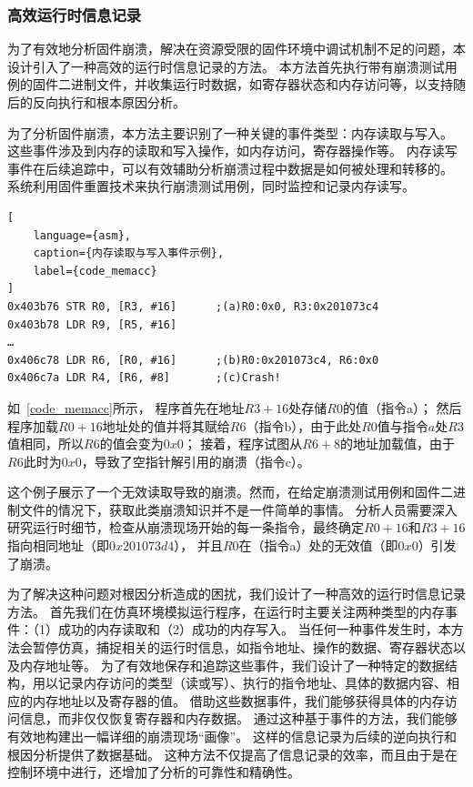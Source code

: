 \subsubsection{高效运行时信息记录}
为了有效地分析固件崩溃，解决在资源受限的固件环境中调试机制不足的问题，本设计引入了一种高效的运行时信息记录的方法。
本方法首先执行带有崩溃测试用例的固件二进制文件，并收集运行时数据，如寄存器状态和内存访问等，以支持随后的反向执行和根本原因分析。

为了分析固件崩溃，本方法主要识别了一种关键的事件类型：内存读取与写入。
这些事件涉及到内存的读取和写入操作，如内存访问，寄存器操作等。
内存读写事件在后续追踪中，可以有效辅助分析崩溃过程中数据是如何被处理和转移的。
系统利用固件重置技术来执行崩溃测试用例，同时监控和记录内存读写。
\begin{lstlisting}[
    language={asm},
    caption={内存读取与写入事件示例},
    label={code_memacc}
]
0x403b76 STR R0, [R3, #16]      ;(a)R0:0x0, R3:0x201073c4
0x403b78 LDR R9, [R5, #16]
…
0x406c78 LDR R6, [R0, #16]      ;(b)R0:0x201073c4, R6:0x0
0x406c7a LDR R4, [R6, #8]       ;(c)Crash!
\end{lstlisting}

如~\autoref{code_memacc}所示， 程序首先在地址$R3 + 16$处存储$R0$的值（指令a）；
然后程序加载$R0 + 16$地址处的值并将其赋给$R6$（指令b），由于此处$R0$值与指令$a$处$R3$值相同，所以$R6$的值会变为$0x0$；
接着，程序试图从$R6 + 8$的地址加载值，由于$R6$此时为$0x0$，导致了空指针解引用的崩溃（指令c）。

这个例子展示了一个无效读取导致的崩溃。然而，在给定崩溃测试用例和固件二进制文件的情况下，获取此类崩溃知识并不是一件简单的事情。
分析人员需要深入研究运行时细节，检查从崩溃现场开始的每一条指令，最终确定$R0 + 16$和$R3 + 16$指向相同地址（即$0x201073d4$），
并且$R0$在（指令a）处的无效值（即$0x0$）引发了崩溃。

为了解决这种问题对根因分析造成的困扰，我们设计了一种高效的运行时信息记录方法。
首先我们在仿真环境模拟运行程序，在运行时主要关注两种类型的内存事件：（1）成功的内存读取和（2）成功的内存写入。
当任何一种事件发生时，本方法会暂停仿真，捕捉相关的运行时信息，如指令地址、操作的数据、寄存器状态以及内存地址等。
为了有效地保存和追踪这些事件，我们设计了一种特定的数据结构，用以记录内存访问的类型（读或写）、执行的指令地址、具体的数据内容、相应的内存地址以及寄存器的值。
借助这些数据事件，我们能够获得具体的内存访问信息，而非仅仅恢复寄存器和内存数据。
通过这种基于事件的方法，我们能够有效地构建出一幅详细的崩溃现场“画像”。
这样的信息记录为后续的逆向执行和根因分析提供了数据基础。
这种方法不仅提高了信息记录的效率，而且由于是在控制环境中进行，还增加了分析的可靠性和精确性。
